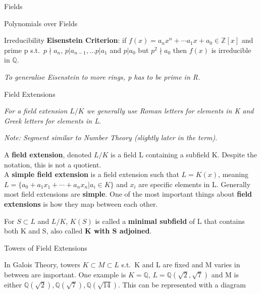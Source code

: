 \documentclass[12pt, letterpaper]{article}
\newcommand{\Q}{\mathbb{Q}}
\newcommand{\Z}{\mathbb{Z}}
\begin{document}
\begin{section}{Fields}
\begin{subsection}{Polynomials over Fields}
\begin{subsubsection}{Irreducibility}
      \textbf{Eisenstein Criterion}: if \(f(x) = a_{n}x^{n} + \cdots a_{1}x +
      a_{0} \in \Z[x]\) and prime p s.t.\ \(p \nmid a_{n}\),
      \(p | a_{n - 1}, \dots p | a_{1}\) and \(p | a_{0}\) but \(p^{2} \nmid
      a_{0}\) then \(f(x)\) is irreducible in \(\Q\).

      \textit{To generalise Eisenstein to more rings, p has to be prime in R.}

    \end{subsubsection}

  \end{subsection}

  \begin{subsection}{Field Extensions}

    \textit{For a field extension \(L / K\) we generally use Roman letters for
      elements in K and Greek letters for elements in L}.

    \textit{Note: Segment similar to Number Theory (slightly later in the
      term)}.

    A \textbf{field extension}, denoted \(L / K\) is a field L containing a
    subfield K. Despite the notation, this is not a quotient. \\
    A \textbf{simple field extension} is a field extension such that
    \(L = K(x)\), meaning \(L = \{a_{0} + a_{1}x_{1} + \cdots + a_{n}x_{n}
    | a_{i} \in K\}{}\) and \(x_{i}\) are specific elements in L. Generally
    most field extensions are \textbf{simple}. One of the most important things
    about \textbf{field extensions} is how they map between each other.

    For \(S \subset L\) and \(L / K\), \(K(S)\) is called a \textbf{minimal
      subfield} of L that contains both K and S, also called \textbf{K with
      S adjoined}.

    \begin{subsubsection}{Towers of Field Extensions}

      In Galois Theory, towers \(K \subset M \subset L\) s.t.\ K and L are
      fixed and M varies in between are important. One example is \(K =
      \Q\), \(L = \Q(\sqrt{2}, \sqrt{7})\) and M is either
      \(\Q(\sqrt{2}), \Q(\sqrt{7}), \Q(\sqrt{14})\).
      This can be represented with a diagram
      \begin{center}
\end{center}
\end{subsubsection}
\end{subsection}
\end{section}
\end{document}
